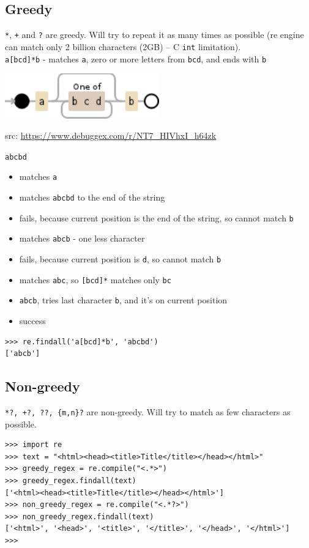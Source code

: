 \documentclass{beamer}
\begin{document}
\subsection{Greedy}
\begin{frame}[fragile]
\verb/*/, \verb/+/ and \verb/?/ are greedy. Will try to repeat it as many times as possible (re engine can match only 2 billion characters (2GB) -- C \verb/int/ limitation). \\
\pause
\verb/a[bcd]*b/ - matches \verb/a/, zero or more letters from \verb/bcd/, and ends with \verb/b/ \\
\begin{center}
\includegraphics[width=0.5\textwidth]{images/greedy.png}
\end{center}
src: \url{https://www.debuggex.com/r/NT7_HIVhxI_h64zk}
\end{frame}

\begin{frame}[fragile]
\verb/abcbd/
\begin{itemize}
\item matches \verb/a/
\pause
\item matches \verb/abcbd/ to the end of the string
\pause
\item fails, because current position is the end of the string, so cannot match \verb/b/
\pause
\item matches \verb/abcb/ - one less character
\pause
\item fails, because current position is \verb/d/, so cannot match \verb/b/
\pause
\item matches \verb/abc/, so \verb/[bcd]*/ matches only \verb/bc/
\pause
\item \verb/abcb/, tries last character \verb/b/, and it's on current position
\pause
\item success
\end{itemize}
\begin{lstlisting}
>>> re.findall('a[bcd]*b', 'abcbd')
['abcb']
\end{lstlisting}
\end{frame}

\subsection{Non-greedy}
\begin{frame}[fragile]
\verb/*?, +?, ??, {m,n}?/ are non-greedy. Will try to match as few characters as possible.
\pause

\begin{lstlisting}
>>> import re
>>> text = "<html><head><title>Title</title></head></html>"
>>> greedy_regex = re.compile("<.*>")
>>> greedy_regex.findall(text)
['<html><head><title>Title</title></head></html>']
>>> non_greedy_regex = re.compile("<.*?>")
>>> non_greedy_regex.findall(text)
['<html>', '<head>', '<title>', '</title>', '</head>', '</html>']
>>>
\end{lstlisting}

\end{frame}
\end{document}

